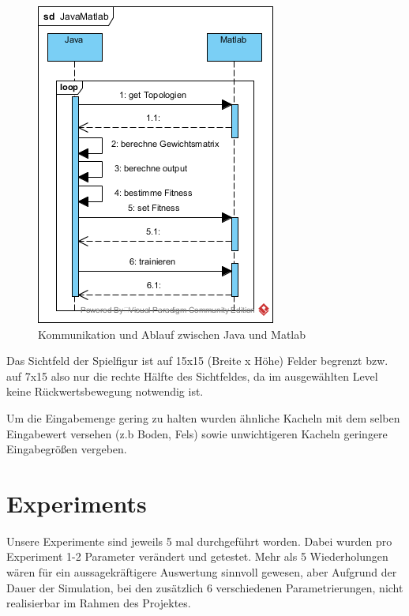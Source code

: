 \documentclass{hbrs-ecta-report}
\begin{document}
\begin{figure}[h!]
	\centering
	\includegraphics[width=\linewidth]{img/JavaMatlab.png}
	\caption{Kommunikation und Ablauf zwischen Java und Matlab}
	\label{fig:sequenzdiagramm} 
\end{figure}

Das Sichtfeld der Spielfigur ist auf 15x15 (Breite x Höhe) Felder begrenzt bzw. auf 7x15 also nur die rechte Hälfte des Sichtfeldes, da im ausgewählten Level keine Rückwertsbewegung notwendig ist.

Um die Eingabemenge gering zu halten wurden ähnliche Kacheln mit dem selben Eingabewert versehen (z.b Boden, Fels) sowie unwichtigeren Kacheln geringere Eingabegrößen vergeben.

\section{Experiments}
Unsere Experimente sind jeweils 5 mal durchgeführt worden. Dabei wurden pro Experiment 1-2 Parameter verändert und getestet. Mehr als 5 Wiederholungen wären für ein aussagekräftigere Auswertung sinnvoll gewesen, aber Aufgrund der Dauer der Simulation, bei den zusätzlich 6 verschiedenen Parametrierungen, nicht realisierbar im Rahmen des Projektes.
\end{document}
